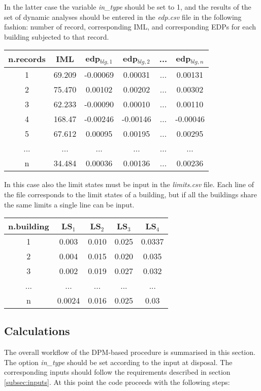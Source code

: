 In the latter case the variable \textit{in\_type} should be set to 1, and the results of the set of dynamic analyses should be entered in the \textit{edp.csv} file in the following fashion: number of record, corresponding IML, and corresponding EDPs for each building subjected to that record.

\begin{table}[H]
\centering
\begin{tabular}{|c|c|c|c|c|c|} \hline
\textbf{n.records} & \textbf{IML} & \textbf{edp$_{blg,1}$} & \textbf{edp$_{blg,2}$} & \textbf{...} & \textbf{edp$_{blg,n}$} \\ \hline
1 &	69.209 &	-0.00069 &	0.00031 & ... &	0.00131\\ \hline
2 &	75.470 &	0.00102 & 	0.00202 & ... &	0.00302\\ \hline
3 &	62.233 &	-0.00090 &	0.00010 & ... &	0.00110\\ \hline
4 &	168.47 &	-0.00246 &	-0.00146 & ... &	-0.00046\\ \hline
5 &	67.612 &	0.00095 & 	0.00195 & ... &	0.00295\\ \hline
... & ... & ... & ... & ... & ...\\ \hline
n &	34.484 &	0.00036 & 	0.00136 & ... & 	0.00236\\ \hline
\end{tabular}
\end{table}

In this case also the limit states must be input in the \textit{limits.csv} file. Each line of the file corresponds to the limit states of a building, but if all the buildings share the same limits a single line can be input.

\begin{table}[H]
\centering
\begin{tabular}{|c|c|c|c|c|} \hline
\textbf{n.building} & \textbf{LS$_1$} & \textbf{LS$_2$} & \textbf{LS$_3$} & \textbf{LS$_4$} \\ \hline
1 & 0.003 &	0.010 &	0.025 &	0.0337\\ \hline
2 & 0.004 &	0.015 &	0.020 &	0.035\\ \hline
3 & 0.002 &	0.019 &	0.027 &	0.032\\ \hline
... & ... & ... & ... & ...\\ \hline
n & 0.0024 &	0.016 &	0.025 &	0.03\\ \hline
\end{tabular}
\end{table}

\subsection{Calculations}
The overall workflow of the DPM-based procedure is summarised in this section. The option \textit{in\_type} should be set according to the input at disposal. The corresponding inputs should follow the requirements described in section \ref{subsec:inputs}. At this point the code proceeds with the following steps:

